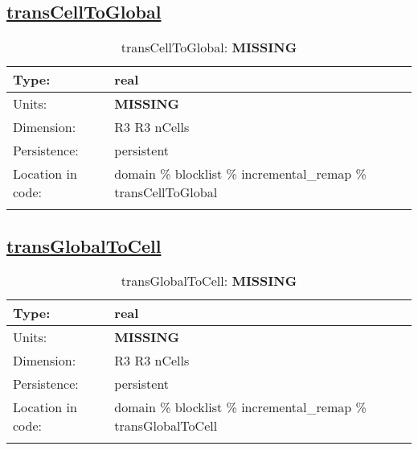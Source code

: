 \subsection[transCellToGlobal]{\hyperref[sec:var_tab_incremental_remap]{transCellToGlobal}}
\label{subsec:var_sec_incremental_remap_transCellToGlobal}
\begin{center}
\begin{longtable}{| p{2.0in} | p{4.0in} |}
        \hline 
        Type: & real \\
        \hline 
        Units: & {\bf \color{red} MISSING} \\
        \hline 
        Dimension: & R3 R3 nCells \\
        \hline 
        Persistence: & persistent \\
        \hline 
         Location in code: & domain \% blocklist \% incremental\_remap \% transCellToGlobal \\
         \hline 
    \caption{transCellToGlobal: {\bf \color{red} MISSING}}
\end{longtable}
\end{center}
\subsection[transGlobalToCell]{\hyperref[sec:var_tab_incremental_remap]{transGlobalToCell}}
\label{subsec:var_sec_incremental_remap_transGlobalToCell}
\begin{center}
\begin{longtable}{| p{2.0in} | p{4.0in} |}
        \hline 
        Type: & real \\
        \hline 
        Units: & {\bf \color{red} MISSING} \\
        \hline 
        Dimension: & R3 R3 nCells \\
        \hline 
        Persistence: & persistent \\
        \hline 
         Location in code: & domain \% blocklist \% incremental\_remap \% transGlobalToCell \\
         \hline 
    \caption{transGlobalToCell: {\bf \color{red} MISSING}}
\end{longtable}
\end{center}
